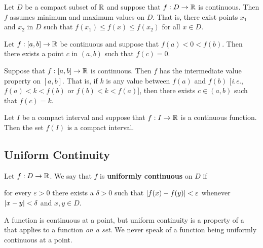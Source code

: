 \documentclass[12pt]{article}
\begin{document}
\begin{corollary}
  Let $D$ be a compact subset of $\mathbb{R}$ and suppose that $f : D \rightarrow
  \mathbb{R}$ is continuous. Then $f$ assumes minimum and maximum values on $D$. That
  is, there exist points $x_1$ and $x_2$ in $D$ such that $f(x_1) \le f(x) \le
  f(x_2)$ for all $x \in D$.
\end{corollary}

\begin{lemma}
  Let $f : [a,b] \rightarrow \mathbb{R}$ be continuous and suppose that $f(a) < 0 <
  f(b)$. Then there exists a point $c$ in $(a,b)$ such that $f(c) = 0$.
\end{lemma}

\begin{definition}
  Suppose that $f : [a,b] \rightarrow \mathbb{R}$ is continuous. Then $f$ has the
  intermediate value property on $[a,b]$. That is, if $k$ is any value between
  $f(a)$ and $f(b)$ [\textit{i.e.}, $f(a) < k < f(b)$ or $f(b) < k < f(a)$],
  then there exists $c \in (a,b)$ such that $f(c) = k$.
\end{definition}

\begin{theorem}
  Let $I$ be a compact interval and suppose that $f : I \rightarrow \mathbb{R}$ is a continuous
  function. Then the set $f(I)$ is a compact interval.
\end{theorem}

\subsection{Uniform Continuity}
\label{sec:org6d1f5e5}
\begin{definition}
  Let $f : D \rightarrow \mathbb{R}$. We say that $f$ is \textbf{uniformly continuous} on
  $D$ if
  \begin{center}
    for every $\varepsilon > 0$ there exists a $\delta > 0$ such that $\left|f(x)
      - f(y)\right| < \varepsilon$ whenever $\left|x - y\right| < \delta$ and $x,y \in D$.
  \end{center}
  A function is continuous at a point, but uniform continuity is a property of a
  that applies to a function \textit{on a set}. We never speak of a function
  being uniformly continuous at a point.
\end{definition}
\end{document}
